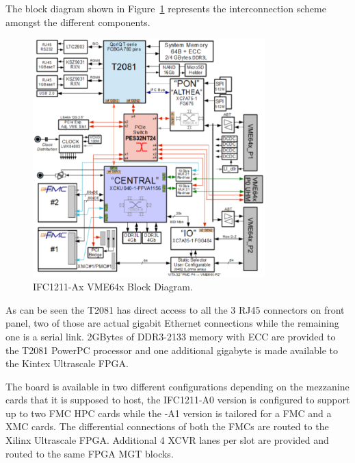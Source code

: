 \documentclass[11pt
  , a4paper
  , article
  , oneside
  , showtrims
]{memoir}
\begin{document}
The block diagram shown in Figure~\ref{fig:ifc1211_bd} represents the interconnection scheme amongst the different components.

\begin{figure}[!htb]
	\centering
	\includegraphics[width=0.80\textwidth]{./pictures/IOxOS_IFC1211_bd.eps}
	\caption{
		IFC1211-Ax VME64x Block Diagram.
	}
	\label{fig:ifc1211_bd}   
\end{figure}

As can be seen the T2081 has direct access to all the 3 RJ45 connectors on front panel, two of those are actual gigabit Ethernet connections while the remaining one is a serial link.
2GBytes of DDR3-2133 memory with ECC are provided to the T2081 PowerPC processor and one additional gigabyte is made available to the Kintex Ultrascale FPGA.

The board is available in two different configurations depending on the mezzanine cards that it is supposed to host, the IFC1211-A0 version is configured to support up to two FMC HPC cards while the -A1 version is tailored for a FMC and a XMC cards.
The differential connections of both the FMCs are routed to the Xilinx Ultrascale FPGA. Additional 4 XCVR lanes per slot are provided and routed to the same FPGA MGT blocks.

\end{document}
